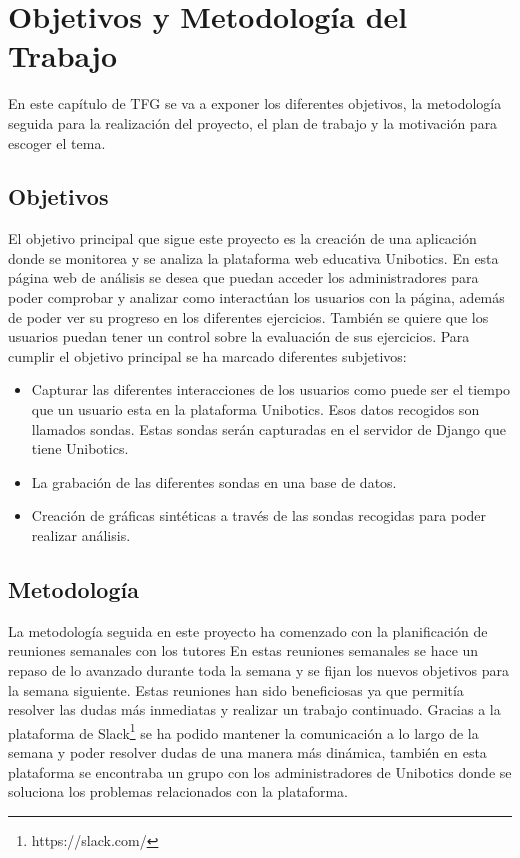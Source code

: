 \chapter{Objetivos y Metodología del Trabajo}\label{objetivos}

En este capítulo de TFG se va a exponer los diferentes objetivos, la metodología seguida para la realización del proyecto, el plan de trabajo y la motivación para escoger el tema.


\section{Objetivos}

El objetivo principal que sigue este proyecto es la creación de una aplicación donde se monitorea y se analiza la plataforma web educativa Unibotics. En esta página web de análisis se desea que puedan acceder los administradores para poder comprobar y analizar como interactúan los usuarios con la página, además de poder ver su progreso en los diferentes ejercicios. También se quiere que los usuarios puedan tener un control sobre la evaluación de sus ejercicios. Para cumplir el objetivo principal se ha marcado diferentes subjetivos:

\begin{itemize}
\item Capturar las diferentes interacciones de los usuarios como puede ser el tiempo que un usuario esta en la plataforma Unibotics. Esos datos recogidos son llamados sondas. Estas sondas serán capturadas en el servidor de Django que tiene Unibotics.

\item La grabación de las diferentes sondas en una base de datos.

\item Creación de gráficas sintéticas a través de las sondas recogidas para poder realizar análisis.
\end{itemize}

\newpage

 
\section{Metodología}

La metodología seguida en este proyecto ha comenzado con la planificación de reuniones semanales con los tutores En estas reuniones semanales se hace un repaso de lo avanzado durante toda la semana y se fijan los nuevos objetivos para la semana siguiente. Estas reuniones han sido beneficiosas ya que permitía resolver las dudas más inmediatas y realizar un trabajo continuado. Gracias a la plataforma de Slack\footnote{https://slack.com/} se ha podido mantener la comunicación a lo largo de la semana y poder resolver dudas de una manera más dinámica, también en esta plataforma se encontraba un grupo con los administradores de Unibotics donde se soluciona los problemas relacionados con la plataforma.\\

